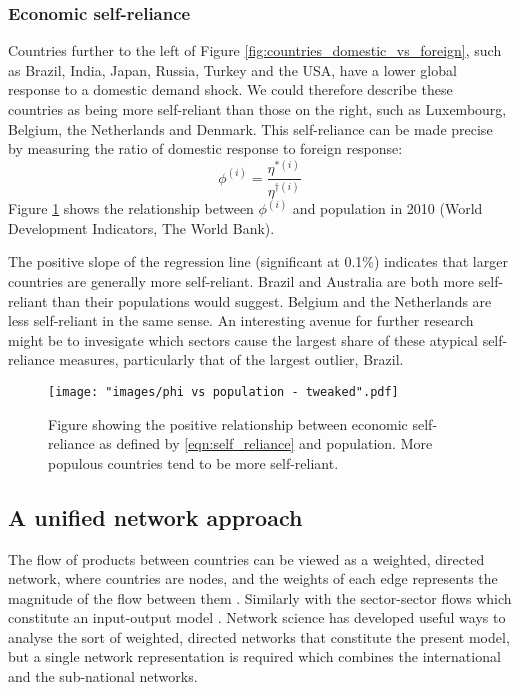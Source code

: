 \documentclass[a4paper]{article}
\begin{document}
\subsubsection*{Economic self-reliance}
Countries further to the left of Figure \ref{fig:countries_domestic_vs_foreign}, such as Brazil, India, Japan, Russia, Turkey and the USA, have a lower global response to a domestic demand shock.
We could therefore describe these countries as being more self-reliant than those on the right, such as Luxembourg, Belgium, the Netherlands and Denmark.
This self-reliance can be made precise by measuring the ratio of domestic response to foreign response:
\begin{equation}\label{eqn:self_reliance}
\phi^{(i)} = \frac{\eta^{*(i)}}{\eta^{\dagger(i)}}
\end{equation}
Figure \ref{fig:phi-vs-pop} shows the relationship between $\phi^{(i)}$ and population in 2010 (World Development Indicators, The World Bank).

The positive slope of the regression line (significant at 0.1\%) indicates that larger countries are generally more self-reliant.
Brazil and Australia are both more self-reliant than their populations would suggest.
Belgium and the Netherlands are less self-reliant in the same sense.
An interesting avenue for further research might be to invesigate which sectors cause the largest share of these atypical self-reliance measures, particularly that of the largest outlier, Brazil.

\begin{figure}[tb]
\centering
\texttt{[image: "images/phi vs population - tweaked".pdf]}
\caption{Figure showing the positive relationship between economic self-reliance as defined by \cref{eqn:self_reliance} and population. More populous countries tend to be more self-reliant.}
\label{fig:phi-vs-pop}
\end{figure}

\subsection{A unified network approach}\label{sec:networkapproach}
The flow of products between countries can be viewed as a weighted, directed network, where countries are nodes, and the weights of each edge represents the magnitude of the flow between them \parencite{nystuen_graph_1961,serrano_topology_2003,bhattacharya_international_2008,baskaran_heckscher-ohlin_2011}.
Similarly with the sector-sector flows which constitute an input-output model \parencite{blochl_vertex_2011,fedriani_simplifying_2012}.
Network science has developed useful ways to analyse the sort of weighted, directed networks that constitute the present model, but a single network representation is required which combines the international and the sub-national networks.
\end{document}
